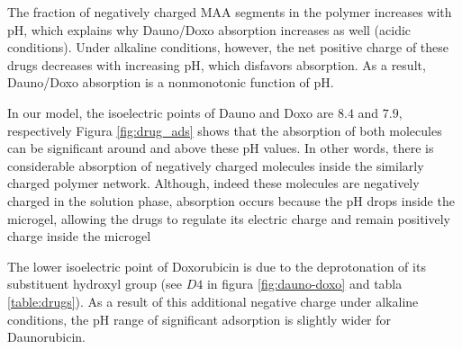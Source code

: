 The fraction of negatively charged MAA segments in the polymer increases with pH, which explains why Dauno/Doxo absorption increases as well (acidic conditions).
Under alkaline conditions, however, the net positive charge of these drugs decreases with increasing pH, which disfavors absorption.
As a result, Dauno/Doxo absorption is a nonmonotonic function of pH.



In our model, the isoelectric points of Dauno and Doxo are $8.4$ and $7.9$, respectively%
Figura \ref{fig:drug_ads} shows that the absorption of both molecules can be significant around and above these pH values.
In other words, there is considerable absorption of negatively charged molecules inside the similarly charged polymer network.
Although, indeed these molecules are negatively charged in the solution phase, absorption occurs because the pH drops inside the microgel, allowing the drugs to regulate its electric charge and remain positively charge inside the microgel %


The lower isoelectric point of Doxorubicin is due to the deprotonation of its substituent hydroxyl group (see $D4$ in figura \ref{fig:dauno-doxo} and tabla \ref{table:drugs}).
As a result of this additional negative charge under alkaline conditions, the pH range of significant adsorption is slightly wider for Daunorubicin.
